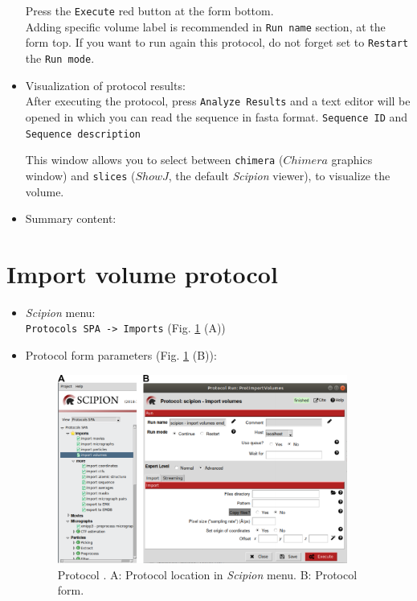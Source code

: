 \documentclass[12pt]{article} %
\newcommand{\ffigure}[1]{{Fig. {\ref{#1}}}\xspace}
\newcommand{\scommand}[1]{{{\keys{#1}}}\xspace}
\def\scipion{\textit{Scipion}\xspace}
\newcommand{\ttt}[1]{\texttt{#1}}
\begin{document}
\begin{appendices}
\begin{itemize}
  Press the \ttt{Execute} red button at the form bottom.\\
  Adding specific volume label is recommended in \ttt{Run name} section, at the form top. If you want to run again this protocol, do not forget set to \ttt{Restart} the \ttt{Run mode}.\\
  
  \item Visualization of protocol results:\\
  
  After executing the protocol, press \ttt{Analyze Results} and a text editor will be opened in which you can read the sequence in fasta format. \ttt{Sequence ID} and \ttt{Sequence description}
  
  
  
  This window allows you to select between \ttt{chimera} ($Chimera$ graphics window) and \ttt{slices} ($ShowJ$, the default \scipion viewer), to visualize the volume.
  
 \item Summary content:\\
   
   
  
  \end{itemize}

\section{Import volume protocol}
\label{app:importVolume}
   
 \begin{itemize}
  \item \scipion menu:\\
  \ttt{Protocols SPA -> Imports} (\ffigure{fig:app_protocol_volume_1} (A))\\
  
  \item Protocol form parameters (\ffigure{fig:app_protocol_volume_1} (B)):\\
  
  \begin{figure}[H]
    \centering 
    \captionsetup{width=.7\linewidth} 
    \includegraphics[width=0.90\textwidth]{Images_appendix/Fig100}
    \caption{Protocol \scommand{import volumes}. A: Protocol location in \scipion menu. B: Protocol form.}
    \label{fig:app_protocol_volume_1}
   \end{figure}
  

\end{itemize}
\end{appendices}
\end{document}
